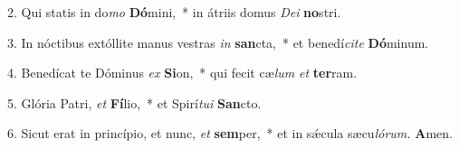 \item 2. Qui statis in do\textit{mo} \textbf{Dó}mini,~* in átriis domus \textit{Dei} \textbf{no}stri.
\item 3. In nóctibus extóllite manus vestras \textit{in} \textbf{san}cta,~* et benedí\textit{cite} \textbf{Dó}minum.
\item 4. Benedícat te Dóminus \textit{ex} \textbf{Si}on,~* qui fecit cæ\textit{lum} \textit{et} \textbf{ter}ram.
\item 5. Glória Patri, \textit{et} \textbf{Fí}lio,~* et Spirí\hspace{0.03em}\textit{tui} \textbf{San}cto.
\item 6. Sicut erat in princípio, et nunc, \textit{et} \textbf{sem}per,~* et in sǽcula sæcu\hspace{0.03em}\textit{lórum.} \textbf{A}men.